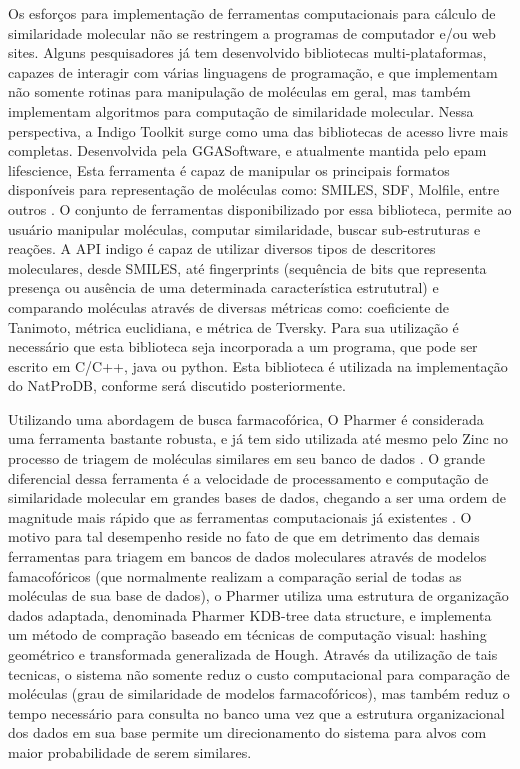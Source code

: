 Os esforços para implementação de ferramentas computacionais para cálculo de similaridade molecular não se restringem a programas de computador e/ou web sites. Alguns pesquisadores já tem desenvolvido bibliotecas multi-plataformas, capazes de interagir com várias linguagens de programação, e que implementam não somente rotinas para manipulação de moléculas em geral, mas também implementam algoritmos para computação de similaridade molecular. Nessa perspectiva, a Indigo Toolkit surge como uma das bibliotecas de acesso livre mais completas. Desenvolvida pela GGASoftware, e atualmente mantida pelo epam lifescience, Esta ferramenta é capaz de manipular os principais formatos disponíveis para representação de moléculas como: SMILES, SDF, Molfile, entre outros \cite{pavlov2011indigo}. O conjunto de ferramentas disponibilizado por essa biblioteca, permite ao usuário manipular moléculas, computar similaridade, buscar sub-estruturas e reações. A API indigo é capaz de utilizar diversos tipos de descritores moleculares, desde SMILES, até fingerprints (sequência de bits que representa presença ou ausência de uma determinada característica estrututral) e comparando moléculas através de diversas métricas como: coeficiente de Tanimoto, métrica euclidiana, e métrica de Tversky. Para sua utilização é necessário que esta biblioteca seja incorporada a um programa, que pode ser escrito em C/C++, java ou python. Esta biblioteca é utilizada na implementação do NatProDB, conforme será discutido posteriormente.

Utilizando uma abordagem de busca farmacofórica, O Pharmer é considerada uma ferramenta bastante robusta, e já tem sido utilizada até mesmo pelo Zinc no processo de triagem de moléculas similares em seu banco de dados \cite{koes2011pharmer}. O grande diferencial dessa ferramenta é a velocidade de processamento e computação de similaridade molecular em grandes bases de dados, chegando a ser uma ordem de magnitude mais rápido que as ferramentas computacionais já existentes \cite{koes2011pharmer}. O motivo para tal desempenho reside no fato de que em detrimento das demais ferramentas para triagem em bancos de dados moleculares através de modelos famacofóricos (que normalmente realizam a comparação serial de todas as moléculas de sua base de dados), o Pharmer utiliza uma estrutura de organização dados adaptada, denominada Pharmer KDB-tree data structure, e implementa um método de compração baseado em técnicas de computação visual: hashing geométrico e transformada generalizada de Hough. Através da utilização de tais tecnicas, o sistema não somente reduz o custo computacional para comparação de moléculas (grau de similaridade de modelos farmacofóricos), mas também reduz o tempo necessário para consulta no banco uma vez que a estrutura organizacional dos dados em sua base permite um direcionamento do sistema para alvos com maior probabilidade de serem similares.

